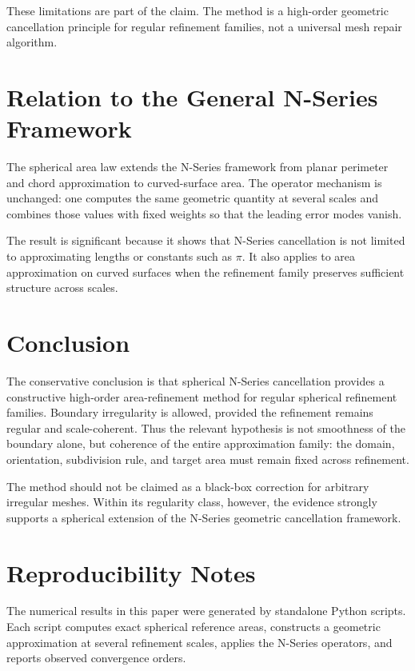 \documentclass[11pt]{article}
\begin{document}
These limitations are part of the claim.  The method is a high-order
geometric cancellation principle for regular refinement families, not a
universal mesh repair algorithm.

\section{Relation to the General N-Series Framework}

The spherical area law extends the N-Series framework from planar perimeter
and chord approximation to curved-surface area.  The operator mechanism is
unchanged: one computes the same geometric quantity at several scales and
combines those values with fixed weights so that the leading error modes
vanish.

The result is significant because it shows that N-Series cancellation is not
limited to approximating lengths or constants such as $\pi$.  It also applies
to area approximation on curved surfaces when the refinement family preserves
sufficient structure across scales.

\section{Conclusion}

The conservative conclusion is that spherical N-Series cancellation provides
a constructive high-order area-refinement method for regular spherical
refinement families.  Boundary irregularity is allowed, provided the
refinement remains regular and scale-coherent.  Thus the relevant hypothesis
is not smoothness of the boundary alone, but coherence of the entire
approximation family: the domain, orientation, subdivision rule, and target
area must remain fixed across refinement.

The method should not be claimed as a black-box correction for arbitrary
irregular meshes.  Within its regularity class, however, the evidence
strongly supports a spherical extension of the N-Series geometric
cancellation framework.

\appendix

\section{Reproducibility Notes}

The numerical results in this paper were generated by standalone Python
scripts.  Each script computes exact spherical reference areas, constructs a
geometric approximation at several refinement scales, applies the N-Series
operators, and reports observed convergence orders.
\end{document}
